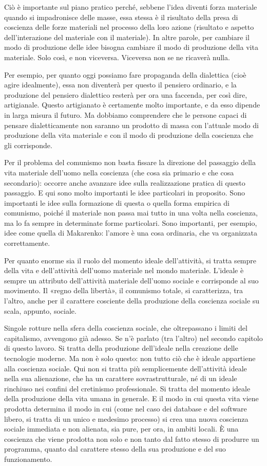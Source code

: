 \documentclass[12pt,a4paper,openany]{book}
\begin{document}
Ciò è importante sul piano pratico perché, sebbene l'idea diventi forza materiale quando si impadronisce delle masse, essa stessa è il risultato della presa di coscienza delle forze materiali nel processo della loro azione (risultato e aspetto dell'interazione del materiale con il materiale). In altre parole, per cambiare il modo di produzione delle idee bisogna cambiare il modo di produzione della vita materiale. Solo così, e non viceversa. Viceversa non se ne ricaverà nulla.

Per esempio, per quanto oggi possiamo fare propaganda della dialettica (cioè agire idealmente), essa non diventerà per questo il pensiero ordinario, e la produzione del pensiero dialettico resterà per ora una faccenda, per così dire, artigianale. Questo artigianato è certamente molto importante, e da esso dipende in larga misura il futuro. Ma dobbiamo comprendere che le persone capaci di pensare dialetticamente non saranno un prodotto di massa con l'attuale modo di produzione della vita materiale e con il modo di produzione della coscienza che gli corrisponde.

Per il problema del comunismo non basta fissare la direzione del passaggio della vita materiale dell'uomo nella coscienza (che cosa sia primario e che cosa secondario): occorre anche avanzare idee sulla realizzazione pratica di questo passaggio. E qui sono molto importanti le idee particolari in proposito. Sono importanti le idee sulla formazione di questa o quella forma empirica di comunismo, poiché il materiale non passa mai tutto in una volta nella coscienza, ma lo fa sempre in determinate forme particolari. Sono importanti, per esempio, idee come quella di Makarenko: l'amore è una cosa ordinaria, che va organizzata correttamente.

Per quanto enorme sia il ruolo del momento ideale dell'attività, si tratta sempre della vita e dell'attività dell'uomo materiale nel mondo materiale. L'ideale è sempre un attributo dell'attività materiale dell'uomo sociale e corrisponde al suo movimento. Il «regno della libertà», il comunismo totale, si caratterizza, tra l'altro, anche per il carattere cosciente della produzione della coscienza sociale su scala, appunto, sociale.

Singole rotture nella sfera della coscienza sociale, che oltrepassano i limiti del capitalismo, avvengono già adesso. Se n'è parlato (tra l'altro) nel secondo capitolo di questo lavoro. Si tratta della produzione dell'ideale nella creazione delle tecnologie moderne. Ma non è solo questo: non tutto ciò che è ideale appartiene alla coscienza sociale. Qui non si tratta più semplicemente dell'attività ideale nella sua alienazione, che ha un carattere sovrastrutturale, né di un ideale rinchiuso nei confini del cretinismo professionale. Si tratta del momento ideale della produzione della vita umana in generale. E il modo in cui questa vita viene prodotta determina il modo in cui (come nel caso dei database e del software libero, si tratta di un unico e medesimo processo) si crea una nuova coscienza sociale immediata e non alienata, sia pure, per ora, in ambiti locali. È una coscienza che viene prodotta non solo e non tanto dal fatto stesso di produrre un programma, quanto dal carattere stesso della sua produzione e del suo funzionamento.
\end{document}
